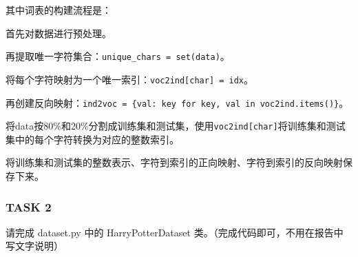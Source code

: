 \documentclass{article}%
\begin{document}
其中词表的构建流程是：

首先对数据进行预处理。

再提取唯一字符集合：\verb|unique_chars = set(data)|。

将每个字符映射为一个唯一索引：\verb|voc2ind[char] = idx|。

再创建反向映射：\verb|ind2voc = {val: key for key, val in voc2ind.items()}|。

将data按80\%和20\%分割成训练集和测试集，使用\verb|voc2ind[char]|将训练集和测试集中的每个字符转换为对应的整数索引。

将训练集和测试集的整数表示、字符到索引的正向映射、字符到索引的反向映射保存下来。

\subsubsection{TASK 2}
请完成 dataset.py 中的 HarryPotterDataset 类。（完成代码即可，不用在报告中写文字说明）
\end{document}
